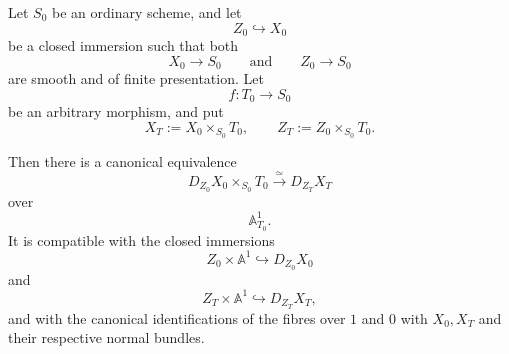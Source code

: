 \begin{lemma}
\label{lem:deformation-space-arbitrary-base-change}
Let \(S_0\) be an ordinary scheme, and let
\[
    Z_0
    \hookrightarrow
    X_0
\]
be a closed immersion such that both
\[
    X_0
    \longrightarrow
    S_0
    \qquad\text{and}\qquad
    Z_0
    \longrightarrow
    S_0
\]
are smooth and of finite presentation.  Let
\[
    f
    \colon
    T_0
    \longrightarrow
    S_0
\]
be an arbitrary morphism, and put
\[
    X_T
    :=
    X_0\times_{S_0}T_0,
    \qquad
    Z_T
    :=
    Z_0\times_{S_0}T_0.
\]

Then there is a canonical equivalence
\[
    D_{Z_0}X_0
    \times_{S_0}
    T_0
    \xrightarrow{\simeq}
    D_{Z_T}X_T
\]
over
\[
    \mathbb A^1_{T_0}.
\]
It is compatible with the closed immersions
\[
    Z_0\times\mathbb A^1
    \hookrightarrow
    D_{Z_0}X_0
\]
and
\[
    Z_T\times\mathbb A^1
    \hookrightarrow
    D_{Z_T}X_T,
\]
and with the canonical identifications of the fibres over \(1\) and
\(0\) with \(X_0,X_T\) and their respective normal bundles.
\end{lemma}

